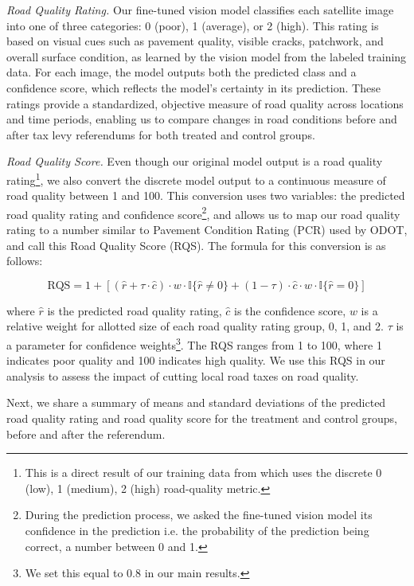 \textit{Road Quality Rating.} Our fine-tuned vision model classifies each satellite image into one of three categories: 0 (poor), 1 (average), or 2 (high). This rating is based on visual cues such as pavement quality, visible cracks, patchwork, and overall surface condition, as learned by the vision model from the labeled training data. For each image, the model outputs both the predicted class and a confidence score, which reflects the model's certainty in its prediction. These ratings provide a standardized, objective measure of road quality across locations and time periods, enabling us to compare changes in road conditions before and after tax levy referendums for both treated and control groups.

\textit{Road Quality Score.} Even though our original model output is a road quality rating\footnote{This is a direct result of our training data from \cite{brewer2021} which uses the discrete 0 (low), 1 (medium), 2 (high) road-quality metric.}, we also convert the discrete model output to a continuous measure of road quality between 1 and 100. This conversion uses two variables: the predicted road quality rating and confidence score\footnote{During the prediction process, we asked the fine-tuned vision model its confidence in the prediction i.e. the probability of the prediction being correct, a number between 0 and 1.}, and allows us to map our road quality rating to a number similar to Pavement Condition Rating (PCR) used by ODOT, and call this Road Quality Score (RQS). The formula for this conversion is as follows:

\begin{equation}
\text{RQS} = 1 + [
\left( \hat{r} + \tau \cdot \hat{c} \right) \cdot w \cdot \mathbb{I}\{\hat{r} \ne 0\}
+ (1 - \tau) \cdot \hat{c} \cdot w  \cdot \mathbb{I}\{\hat{r} = 0\} ]
\label{eq:rqs_formula}
\end{equation}

\noindent 
where $\hat{r}$ is the predicted road quality rating, $\hat{c}$ is the confidence score, $w$ is a relative weight for allotted size of each road quality rating group, 0, 1, and 2. $\tau$ is a parameter for confidence weights\footnote{We set this equal to 0.8 in our main results.}. The RQS ranges from 1 to 100, where 1 indicates poor quality and 100 indicates high quality. We use this RQS in our analysis to assess the impact of cutting local road taxes on road quality.

Next, we share a summary of means and standard deviations of the predicted road quality rating and road quality score for the treatment and control groups, before and after the referendum. 


